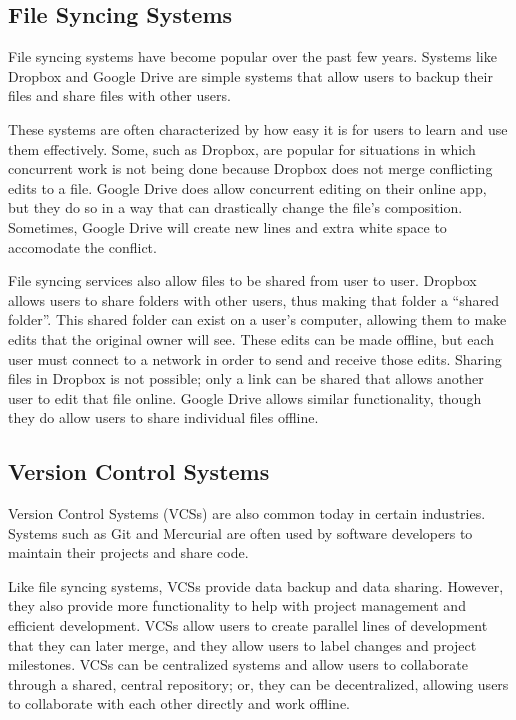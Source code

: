 \subsection{File Syncing Systems}

File syncing systems have become popular over the past few years. Systems like Dropbox and Google Drive are simple systems that allow users to backup their files and share files with other users. 

These systems are often characterized by how easy it is for users to learn and use them effectively. Some, such as Dropbox, are popular for situations in which concurrent work is not being done because Dropbox does not merge conflicting edits to a file. Google Drive does allow concurrent editing on their online app, but they do so in a way that can drastically change the file's composition. Sometimes, Google Drive will create new lines and extra white space to accomodate the conflict. 

File syncing services also allow files to be shared from user to user. Dropbox allows users to share folders with other users, thus making that folder a ``shared folder''. This shared folder can exist on a user's computer, allowing them to make edits that the original owner will see. These edits can be made offline, but each user must connect to a network in order to send and receive those edits. Sharing files in Dropbox is not possible; only a link can be shared that allows another user to edit that file online. Google Drive allows similar functionality, though they do allow users to share individual files offline.

\subsection{Version Control Systems}

Version Control Systems (VCSs) are also common today in certain industries. Systems such as Git and Mercurial are often used by software developers to maintain their projects and share code.

Like file syncing systems, VCSs provide data backup and data sharing. However, they also provide more functionality to help with project management and efficient development. VCSs allow users to create parallel lines of development that they can later merge, and they allow users to label changes and project milestones. VCSs can be centralized systems and allow users to collaborate through a shared, central repository; or, they can be decentralized, allowing users to collaborate with each other directly and work offline.


